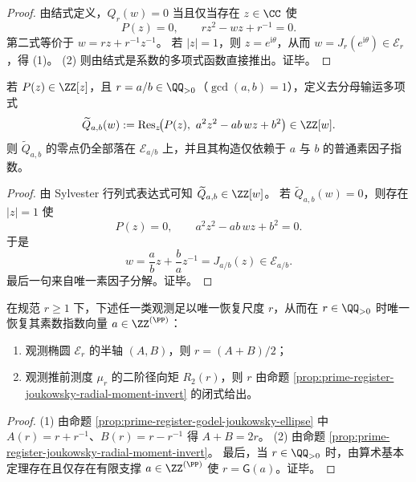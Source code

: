 \begin{proof}
由结式定义，\(Q_r(w)=0\) 当且仅当存在 \(z\in\CC\) 使
\[
P(z)=0,
\qquad
rz^2-wz+r^{-1}=0.
\]
第二式等价于 \(w=rz+r^{-1}z^{-1}\)。
若 \(|z|=1\)，则 \(z=e^{\mathrm{i}\theta}\)，从而 \(w=J_r(e^{\mathrm{i}\theta})\in\mathcal E_r\)，得 (1)。
(2) 则由结式是系数的多项式函数直接推出。证毕。
\end{proof}

\begin{corollary}\label{cor:prime-register-rational-godel-integer-closure}
若 \(P(z)\in\ZZ[z]\)，且 \(r=a/b\in\QQ_{>0}\)（\(\gcd(a,b)=1\)），定义去分母输运多项式
\[
\widetilde Q_{a,b}(w)
:=  
\operatorname{Res}_{z}\!\bigl(P(z),\ a^2z^2-ab\,wz+b^2\bigr)\in\ZZ[w].
\]
则 \(\widetilde Q_{a,b}\) 的零点仍全部落在 \(\mathcal E_{a/b}\) 上，并且其构造仅依赖于 \(a\) 与 \(b\) 的普通素因子指数。
\end{corollary}

\begin{proof}
由 Sylvester 行列式表达式可知 \(\widetilde Q_{a,b}\in\ZZ[w]\)。
若 \(\widetilde Q_{a,b}(w)=0\)，则存在 \(|z|=1\) 使
\[
P(z)=0,
\qquad
a^2z^2-ab\,wz+b^2=0.
\]
于是
\[
w=\frac{a}{b}z+\frac{b}{a}z^{-1}=J_{a/b}(z)\in\mathcal E_{a/b}.
\]
最后一句来自唯一素因子分解。证毕。
\end{proof}

\begin{theorem}\label{thm:prime-register-ellipse-invert-godel}
在规范 \(r\ge1\) 下，下述任一类观测足以唯一恢复尺度 \(r\)，从而在 \(r\in\QQ_{>0}\) 时唯一恢复其素数指数向量 \(a\in\ZZ^{(\PP)}\)：
\begin{enumerate}
  \item 观测椭圆 \(\mathcal E_r\) 的半轴 \((A,B)\)，则 \(r=(A+B)/2\)；
  \item 观测推前测度 \(\mu_r\) 的二阶径向矩 \(R_2(r)\)，则 \(r\) 由命题 \ref{prop:prime-register-joukowsky-radial-moment-invert} 的闭式给出。
\end{enumerate}
\end{theorem}

\begin{proof}
(1) 由命题 \ref{prop:prime-register-godel-joukowsky-ellipse} 中 \(A(r)=r+r^{-1}\)、\(B(r)=r-r^{-1}\) 得 \(A+B=2r\)。
(2) 由命题 \ref{prop:prime-register-joukowsky-radial-moment-invert}。
最后，当 \(r\in\QQ_{>0}\) 时，由算术基本定理存在且仅存在有限支撑 \(a\in\ZZ^{(\PP)}\) 使 \(r=\mathsf G(a)\)。证毕。
\end{proof}

